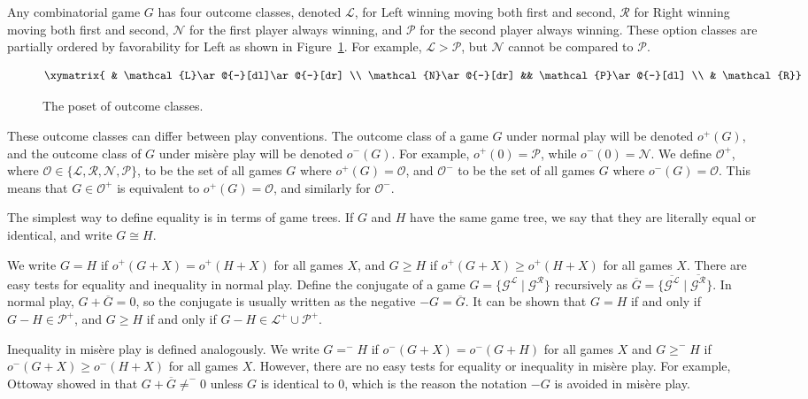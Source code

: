 \documentclass{amsart}
\theoremstyle{plain}
\theoremstyle{definition}
\theoremstyle{remark}
\numberwithin{equation}{section}
\numberwithin{thm}{section}
\begin{document}
Any combinatorial game $G$ has four outcome classes, denoted $\mathcal{L}$, for Left winning moving both first and second, $\mathcal{R}$ for Right winning moving both first and second, $\mathcal{N}$ for the first player always winning, and $\mathcal{P}$ for the second player always winning. These option classes are partially ordered by favorability for Left  as shown in Figure~\ref{fig:outcomeposet}. For example, $\mathcal{L} > \mathcal{P}$, but $\mathcal{N}$ cannot be compared to $\mathcal{P}$.

\begin{figure}
\[\xymatrix{ & \mathcal{L}\ar@{-}[dl]\ar@{-}[dr] \\ \mathcal{N}\ar@{-}[dr] && \mathcal{P}\ar@{-}[dl] \\ & \mathcal{R}}\]
\caption{The poset of outcome classes.}
\label{fig:outcomeposet}
\end{figure}

These outcome classes can differ between play conventions. The outcome class of a game $G$ under normal play will be denoted $o^+(G)$, and the outcome class of $G$ under mis\`ere play will be denoted $o^-(G)$. For example, $o^+(0) = \mathcal{P}$, while $o^-(0) = \mathcal{N}$. We define $\mathcal{O}^+$, where $\mathcal{O} \in \{\mathcal{L,R,N,P}\}$, to be the set of all games $G$ where $o^+(G) = \mathcal{O}$, and $\mathcal{O}^-$ to be the set of all games $G$ where $o^-(G) = \mathcal{O}$. This means that $G \in \mathcal{O}^+$ is equivalent to $o^+(G) = \mathcal{O}$, and similarly for $\mathcal{O}^-$. 

The simplest way to define equality is in terms of game trees. If $G$ and $H$ have the same game tree, we say that they are literally equal or identical, and write $G \cong H$.

We write $G = H$ if $o^+(G+X) = o^+(H+X)$ for all games $X$, and $G \geq H$ if $o^+(G+X) \geq o^+(H+X)$ for all games $X$. There are easy tests for equality and inequality in normal play. Define the conjugate of a game $G = \{\mathcal{G}^{\mathcal{L}}\mid\mathcal{G}^{\mathcal{R}}\}$ recursively as $\overline{G }= \{\overline{\mathcal{G}^{\mathcal{L}}}\mid \overline{\mathcal{G}^{\mathcal{R}} }\}$. In normal play, $G + \overline{G} = 0$, so the conjugate is usually written as the negative $-G = \overline{G}$. 
It can be shown that $G = H$ if and only if $G-H \in \mathcal{P}^+$, and $G\geq H$ if and only if $G - H \in \mathcal{L}^+ \cup \mathcal{P}^+$. 

Inequality in mis\`ere play is defined analogously. We write $G=^- H$ if $o^-(G+X) =o^-(G+H) $ for all games $X$ and $G \geq^- H$ if $o^-(G+X) \geq o^-(H+X)$ for all games $X$. However, there are no easy tests for equality or inequality in mis\`ere play. For example, Ottoway showed in \cite{ottoway_zero} that $G+\overline{G} \neq^- 0$ unless $G$ is identical to $0$, which is the reason the notation $-G$ is avoided in mis\`ere play.
\end{document}
